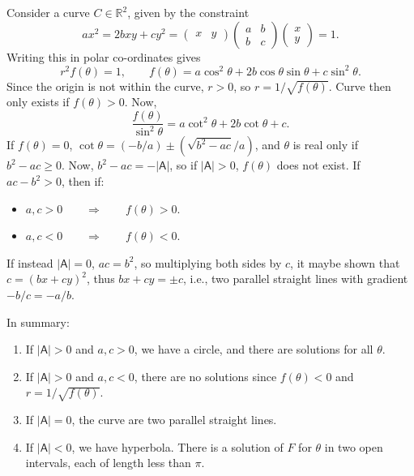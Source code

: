 \documentclass[letter-paper]{tufte-book}
\begin{document}
Consider a curve $C\in\mathbb{R}^2$, given by the constraint
\begin{equation*}
	ax^2=2bxy+cy^2 = \begin{pmatrix}x & y\end{pmatrix}
	\begin{pmatrix}a & b\\ b & c\end{pmatrix}
	\begin{pmatrix}x\\ y\end{pmatrix}=1.
\end{equation*}
Writing this in polar co-ordinates gives
\begin{equation*}
	r^2 f(\theta)=1,\qquad f(\theta)=a\cos^2\theta + 2b\cos\theta\sin\theta
	+ c\sin^2\theta.
\end{equation*}
Since the origin is not within the curve, $r>0$, so $r=1/\sqrt{f(\theta)}$.
Curve then only exists if $f(\theta)>0$. Now,
\begin{equation*}
	\frac{f(\theta)}{\sin^2 \theta}=a\cot^2 \theta + 2b\cot\theta + c.
\end{equation*}
If $f(\theta)=0$, $\cot\theta=(-b/a)\pm(\sqrt{b^2-ac}/a)$, and $\theta$ is real
only if $b^2-ac\geq0$. Now, $b^2-ac=-|\mathsf{A}|$, so if $|\mathsf{A}|>0$,
$f(\theta)$ does not exist. If $ac-b^2>0$, then if:
\begin{itemize}
	\item $a,c>0\qquad\Rightarrow\qquad f(\theta)>0$.
	\item $a,c<0\qquad\Rightarrow\qquad f(\theta)<0$.
\end{itemize}
If instead $|\mathsf{A}|=0$, $ac=b^2$, so multiplying both sides by $c$, it
maybe shown that $c=(bx+cy)^2$, thus $bx+cy=\pm c$, i.e., two parallel straight
lines with gradient $-b/c=-a/b$.

In summary:
\begin{enumerate}
	\item If $|\mathsf{A}|>0$ and $a,c>0$, we have a circle, and there are
	solutions for all $\theta$.
	\item If $|\mathsf{A}|>0$ and $a,c<0$, there are no solutions since
	$f(\theta)<0$ and $r=1/\sqrt{f(\theta)}$.
	\item If $|\mathsf{A}|=0$, the curve are two parallel straight lines.
	\item If $|\mathsf{A}|<0$, we have hyperbola. There is a solution of $F$ for
	$\theta$ in two open intervals, each of length less than $\pi$.
\end{enumerate}
\end{document}
